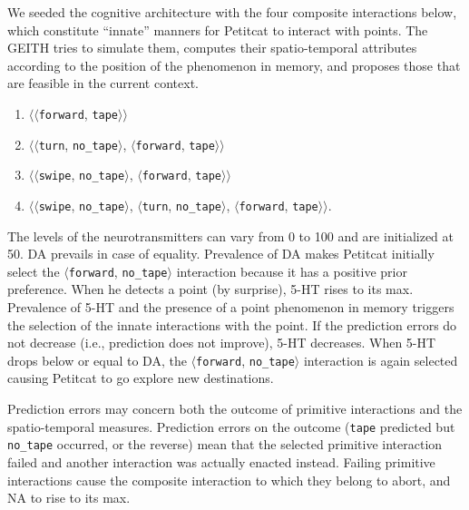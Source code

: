 \documentclass[runningheads]{llncs}
\begin{document}
We seeded the cognitive architecture with the four composite interactions below, which constitute ``innate'' manners for Petitcat to interact with points. 
The GEITH tries to simulate them, computes their spatio-temporal attributes according to the position of the phenomenon in memory, and proposes those that are feasible in the current context.
\begin{enumerate}
	\item $\langle\langle$\texttt{forward}, \texttt{tape}$\rangle\rangle$
	\item $\langle\langle$\texttt{turn}, \texttt{no\_tape}$\rangle$, $\langle$\texttt{forward}, \texttt{tape}$\rangle\rangle$
	\item $\langle\langle$\texttt{swipe}, \texttt{no\_tape}$\rangle$, $\langle$\texttt{forward}, \texttt{tape}$\rangle\rangle$
	\item $\langle\langle$\texttt{swipe}, \texttt{no\_tape}$\rangle$, $\langle$\texttt{turn}, \texttt{no\_tape}$\rangle$, $\langle$\texttt{forward}, \texttt{tape}$\rangle\rangle$. 
\end{enumerate}

The levels of the neurotransmitters can vary from 0 to 100 and are initialized at 50. DA prevails in case of equality.
Prevalence of DA makes Petitcat initially select the $\langle$\texttt{forward}, \texttt{no\_tape}$\rangle$ interaction because it has a positive prior preference.
When he detects a point (by surprise), 5-HT rises to its max. 
Prevalence of 5-HT and the presence of a point phenomenon in memory triggers the selection of the innate interactions with the point.
If the prediction errors do not decrease (i.e., prediction does not improve), 5-HT decreases.
When 5-HT drops below or equal to DA, the  $\langle$\texttt{forward}, \texttt{no\_tape}$\rangle$ interaction is again selected causing Petitcat to go explore new destinations. 

Prediction errors may concern both the outcome of primitive interactions and the spatio-temporal measures.
Prediction errors on the outcome (\texttt{tape} predicted but \texttt{no\_tape} occurred, or the reverse) mean that the selected primitive interaction failed and another interaction was actually enacted instead. 
Failing primitive interactions cause the composite interaction to which they belong to abort, and NA to rise to its max.
\end{document}
